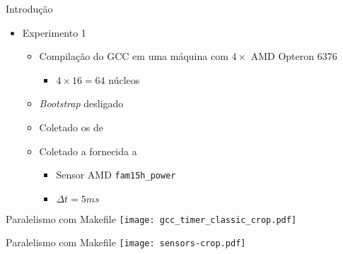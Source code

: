 \begin{frame}{Introdução}
    \begin{itemize}
        \item Experimento 1
        \begin{itemize}
            \item Compilação do GCC em uma máquina com $4\times$ AMD Opteron 6376
                \begin{itemize}
                    \item $4 \times 16 = 64$ núcleos
                \end{itemize}
            \item \textit{Bootstrap} desligado
            \item Coletado os {\color{blue}{tempos de compilação}} de {\color{red}{cada arquivo}}
            \item Coletado a {\color{blue}{soma da potência instantânea}} fornecida a
                {\color{red}{cada processador}}
                \begin{itemize}
                    \item Sensor AMD \texttt{fam15h\_power}
                    \item $\Delta t = 5ms$
                \end{itemize}
        \end{itemize}
    \end{itemize}
\end{frame}

\begin{frame}
    Paralelismo com Makefile
    \texttt{[image: gcc\_timer\_classic\_crop.pdf]}
    \label{fig:analysis_classical}
\end{frame}

\begin{frame}
    Paralelismo com Makefile
    \texttt{[image: sensors-crop.pdf]}
    \label{fig:analysis_classical}
\end{frame}

